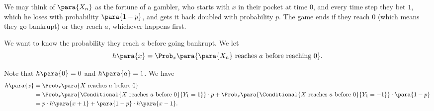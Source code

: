 \begin{example}
    \label{ex:random-walk-gambler}%
    We may think of \(\para{X_n}\) as the fortune of a gambler, who starts with \(x\) in their pocket at time \(0\), and every time step they bet \(1\), which he loses with probability \(\para{1 - p}\), and gets it back doubled with probability \(p\). The game ends if they reach \(0\) (which means they go bankrupt) or they reach \(a\), whichever happens first.

    We want to know the probability they reach \(a\) before going bankrupt. We let
    \[
        h\para{x} = \Prob_x \para{\para{X_n} \text{ reaches }a\text{ before reaching }0}.
    \]

    Note that \(h\para{0} = 0\) and \(h\para{a} = 1\). We have
    \begin{align*}
        h\para{x} &= \Prob_x \para{X \text{ reaches }a\text{ before }0} \\
        &= \Prob_x \para{\Conditional{X \text{ reaches }a\text{ before }0}{Y_1 = 1}} \cdot p + \Prob_x \para{\Conditional{X \text{ reaches }a\text{ before }0}{Y_1 = -1}} \cdot \para{1 - p} \\
        &= p \cdot h \para{x + 1} + \para{1 - p} \cdot h \para{x - 1}.
    \end{align*}
\end{example}

